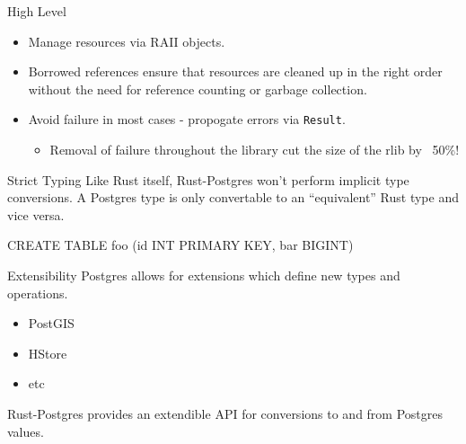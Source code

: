 \documentclass{beamer}
\begin{document}
\begin{frame}[fragile]{High Level}
    \begin{itemize}
        \item Manage resources via RAII objects.
        \item Borrowed references ensure that resources are cleaned up in the right order without the need for reference counting or garbage collection.
        \item Avoid failure in most cases - propogate errors via \verb!Result!.
        \begin{itemize}
            \item Removal of failure throughout the library cut the size of the rlib by ~50\%!
        \end{itemize}
    \end{itemize}
\end{frame}

\begin{frame}[fragile]{Strict Typing}
    Like Rust itself, Rust-Postgres won't perform implicit type conversions. A
    Postgres type is only convertable to an ``equivalent'' Rust type and vice
    versa.
    \begin{sqlcode}
CREATE TABLE foo (id INT PRIMARY KEY, bar BIGINT) 
    \end{sqlcode}
\end{frame}

\begin{frame}{Extensibility}
    Postgres allows for extensions which define new types and operations.
    \begin{itemize}
        \item PostGIS
        \item HStore
        \item etc
    \end{itemize}

    Rust-Postgres provides an extendible API for conversions to and from
    Postgres values.
\end{frame}
\end{document}
